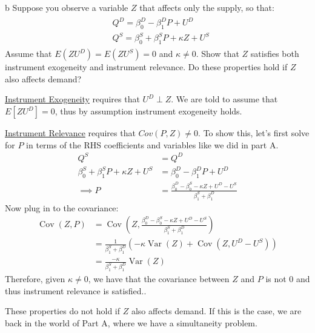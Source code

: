 \documentclass{article}
\begin{document}
\begin{problem}{b}
Suppose you observe a variable $Z$ that affects only the supply, so that:
\begin{align*}
\begin{aligned}
&Q^{D}=\beta_{0}^{D}-\beta_{1}^{D} P+U^{D} \\
&Q^{S}=\beta_{0}^{S}+\beta_{1}^{S} P+\kappa Z+U^{S}
\end{aligned}
\end{align*}
Assume that $E\left(Z U^{D}\right)=E\left(Z U^{S}\right)=0$ and $\kappa \neq 0$. Show that $Z$ satisfies both instrument exogeneity and instrument relevance. Do these properties hold if $Z$ also affects demand?
\end{problem}
\begin{solution}
\underline{Instrument Exogeneity} requires that $U^D \perp Z$. We are told to assume that $E[Z U^D]=0$, thus by assumption instrument exogeneity holds.

\underline{Instrument Relevance} requires that $Cov(P,Z)\neq0$. To show this, let's first solve for $P$ in terms of the RHS coefficients and variables like we did in part A. 
\begin{align*}
    Q^S &= Q^D \\
    \beta_{0}^{S}+\beta_{1}^{S} P + \kappa Z +U^{S} &= \beta_{0}^{D}-\beta_{1}^{D} P+U^{D}\\
    \implies P &= \frac{\beta_{0}^{D} - \beta_{0}^{S} - \kappa Z + U^D - U^S}{\beta_1^S+\beta_1^D}
\end{align*}
Now plug in to the covariance:
\begin{align*}
    \operatorname{Cov}(Z,P) &= \operatorname{Cov} \left(Z,\frac{\beta_{0}^{D} - \beta_{0}^{S} - \kappa Z + U^D - U^S}{\beta_1^S+\beta_1^D} \right) \\
    &= \frac{1}{\beta_1^S+\beta_1^D} \left( -\kappa \operatorname{Var} \left(Z \right) + \operatorname{Cov} \left(Z, U^D - U^S \right) \right) \\
    &= \frac{-\kappa}{\beta_1^S+\beta_1^D} \operatorname{Var} \left(Z \right)
\end{align*}
Therefore, given $\kappa\neq 0$, we have that the covariance between $Z$ and $P$ is not 0 and thus instrument relevance is satisfied..

These properties do not hold if $Z$ also affects demand. If this is the case, we are back in the world of Part A, where we have a simultaneity problem.
\end{solution}
\end{document}
